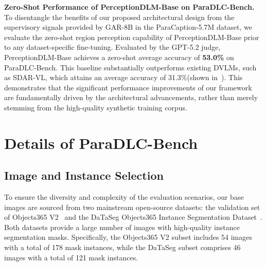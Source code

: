 \begin{table}[htbp]
\centering
\setlength{\belowcaptionskip}{8pt}
\caption{Single Mask Training Ablation on DLC-Bench.}
\label{tab:single_mask_ablation}
\setlength{\tabcolsep}{6pt}
\renewcommand{\arraystretch}{1.15}
\end{table}

\noindent
\textbf{Zero-Shot Performance of PerceptionDLM-Base on ParaDLC-Bench.}
To disentangle the benefits of our proposed architectural design from the supervisory signals provided by GAR-8B in the ParaCaption-5.7M dataset, we evaluate the zero-shot region perception capability of PerceptionDLM-Base prior to any dataset-specific fine-tuning. Evaluated by the GPT-5.2 judge, PerceptionDLM-Base achieves a zero-shot average accuracy of \textbf{53.0\%} on ParaDLC-Bench. This baseline substantially outperforms existing DVLMs, such as SDAR-VL, which attains an average accuracy of 31.3\%(shown in~). This demonstrates that the significant performance improvements of our framework are fundamentally driven by the architectural advancements, rather than merely stemming from the high-quality synthetic training corpus.

\section{Details of ParaDLC-Bench} \label{sec:detail_bench}
\subsection{Image and Instance Selection}
To ensure the diversity and complexity of the evaluation scenarios, our base images are sourced from two mainstream open-source datasets: the validation set of Objects365 V2~\citep{shao2019objects365} and the DaTaSeg Objects365 Instance Segmentation Dataset~\citep{gu2023dataseg}. Both datasets provide a large number of images with high-quality instance segmentation masks. Specifically, the Objects365 V2 subset includes 54 images with a total of 178 mask instances, while the DaTaSeg subset comprises 46 images with a total of 121 mask instances.

